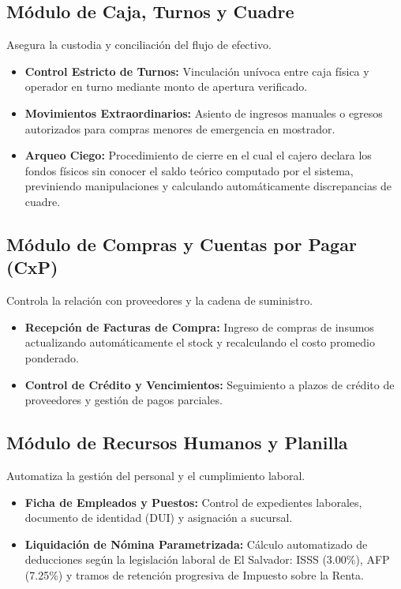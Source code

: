 \subsection{Módulo de Caja, Turnos y Cuadre}
Asegura la custodia y conciliación del flujo de efectivo.
\begin{itemize}
    \item \textbf{Control Estricto de Turnos:} Vinculación unívoca entre caja física y operador en turno mediante monto de apertura verificado.
    \item \textbf{Movimientos Extraordinarios:} Asiento de ingresos manuales o egresos autorizados para compras menores de emergencia en mostrador.
    \item \textbf{Arqueo Ciego:} Procedimiento de cierre en el cual el cajero declara los fondos físicos sin conocer el saldo teórico computado por el sistema, previniendo manipulaciones y calculando automáticamente discrepancias de cuadre.
\end{itemize}

\subsection{Módulo de Compras y Cuentas por Pagar (CxP)}
Controla la relación con proveedores y la cadena de suministro.
\begin{itemize}
    \item \textbf{Recepción de Facturas de Compra:} Ingreso de compras de insumos actualizando automáticamente el stock y recalculando el costo promedio ponderado.
    \item \textbf{Control de Crédito y Vencimientos:} Seguimiento a plazos de crédito de proveedores y gestión de pagos parciales.
\end{itemize}

\subsection{Módulo de Recursos Humanos y Planilla}
Automatiza la gestión del personal y el cumplimiento laboral.
\begin{itemize}
    \item \textbf{Ficha de Empleados y Puestos:} Control de expedientes laborales, documento de identidad (DUI) y asignación a sucursal.
    \item \textbf{Liquidación de Nómina Parametrizada:} Cálculo automatizado de deducciones según la legislación laboral de El Salvador: ISSS (3.00\%), AFP (7.25\%) y tramos de retención progresiva de Impuesto sobre la Renta.
\end{itemize}

